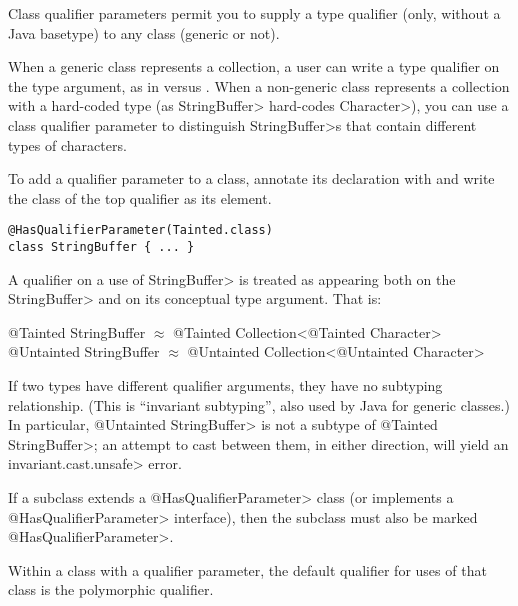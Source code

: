 
Class qualifier parameters permit you to supply a type qualifier (only,
without a Java basetype) to any class (generic or not).

When a generic class represents a collection, a user can write a type
qualifier on the type argument, as in 
versus .  When a non-generic class
represents a collection with a hard-coded type (as \<StringBuffer>
hard-codes \<Character>), you can use a class qualifier parameter to
distinguish \<StringBuffer>s that contain different types of characters.

To add a qualifier parameter to a class, annotate its declaration with 
and write the class of the top qualifier as its element.

\begin{Verbatim}
@HasQualifierParameter(Tainted.class)
class StringBuffer { ... }
\end{Verbatim}

A qualifier on a use of \<StringBuffer> is treated as
appearing both on the \<StringBuffer> and on its conceptual type argument.  That
is:\\
\begin{tt}
  @Tainted StringBuffer $\approx$ @Tainted Collection<@Tainted Character>\\
  @Untainted StringBuffer $\approx$ @Untainted Collection<@Untainted Character>
\end{tt}

If two types have different qualifier arguments, they have no subtyping
relationship.  (This is ``invariant subtyping'', also used by Java for
generic classes.)  In particular, \<@Untainted StringBuffer> is not a
subtype of \<@Tainted StringBuffer>; an attempt to cast between them, in
either direction, will yield an \<invariant.cast.unsafe> error.

If a subclass extends a \<@HasQualifierParameter> class (or implements a
\<@HasQualifierParameter> interface), then the subclass must also be marked
\<@HasQualifierParameter>.


Within a class with a qualifier parameter,
the default qualifier for uses of that class is the polymorphic qualifier.


